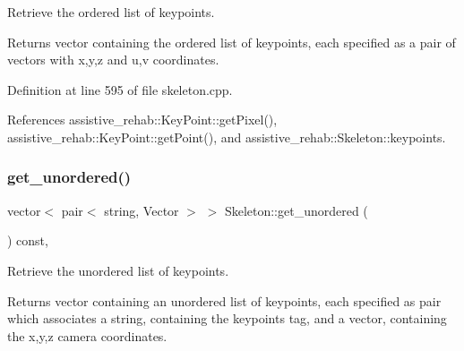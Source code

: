Retrieve the ordered list of keypoints. 

\begin{DoxyReturn}{Returns}
vector containing the ordered list of keypoints, each specified as a pair of vectors with x,y,z and u,v coordinates. 
\end{DoxyReturn}


Definition at line 595 of file skeleton.\+cpp.


\begin{DoxyCode}{0}

\end{DoxyCode}


References assistive\+\_\+rehab\+::\+Key\+Point\+::get\+Pixel(), assistive\+\_\+rehab\+::\+Key\+Point\+::get\+Point(), and assistive\+\_\+rehab\+::\+Skeleton\+::keypoints.

\mbox{\label{classassistive__rehab_1_1Skeleton_a7b9f01b2b0f5450920335347c5861a2f}} 
\subsubsection{\texorpdfstring{get\_unordered()}{get\_unordered()}}
{\footnotesize\ttfamily vector$<$ pair$<$ string, Vector $>$ $>$ Skeleton\+::get\+\_\+unordered (\begin{DoxyParamCaption}{ }\end{DoxyParamCaption}) const\hspace{0.3cm}{\ttfamily [virtual]}, {\ttfamily [inherited]}}



Retrieve the unordered list of keypoints. 

\begin{DoxyReturn}{Returns}
vector containing an unordered list of keypoints, each specified as pair which associates a string, containing the keypoint\textquotesingle{}s tag, and a vector, containing the x,y,z camera coordinates. 
\end{DoxyReturn}


